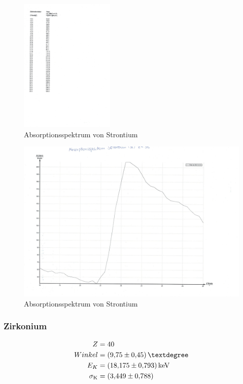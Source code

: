 \begin{figure}[h!]
  \centering
  \includegraphics[width=0.4\textwidth]{strontiumtab.pdf}
  \caption{Absorptionsspektrum von Strontium}
  \label{tab:strontium}
\end{figure}
\begin{figure}[h!]
  \centering
  \includegraphics[width=\textwidth]{strontiumgraph.pdf}
  \caption{Absorptionsspektrum von Strontium}
  \label{fig:strontium}
\end{figure}
\FloatBarrier

\subsubsection{Zirkonium}
\begin{align*}
  Z&=40\\
  Winkel&=\SI{9,75\pm0,45}{°}\\
  E_K&=\SI{18,175\pm0,793}{keV}\\
  \sigma_{\text{K}}&=\SI{3,449\pm0,788}{}
\end{align*}

